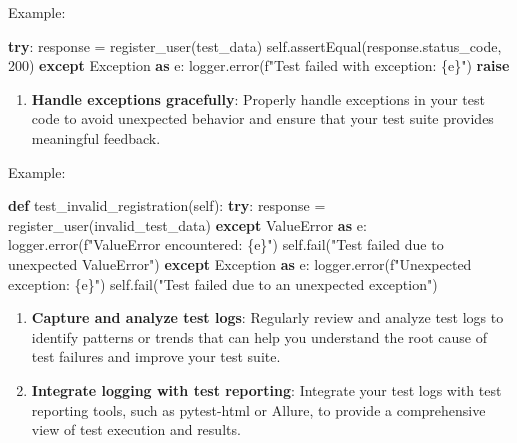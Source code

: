 \documentclass[
  paper=a4,
  ,captions=tableheading
]{scrartcl}
\newenvironment{Shaded}{}{}
\newcommand{\ControlFlowTok}[1]{\textcolor[rgb]{0.00,0.44,0.13}{\textbf{#1}}}
\newcommand{\DecValTok}[1]{\textcolor[rgb]{0.25,0.63,0.44}{#1}}
\newcommand{\ImportTok}[1]{\textcolor[rgb]{0.00,0.50,0.00}{\textbf{#1}}}
\newcommand{\KeywordTok}[1]{\textcolor[rgb]{0.00,0.44,0.13}{\textbf{#1}}}
\newcommand{\NormalTok}[1]{#1}
\newcommand{\OperatorTok}[1]{\textcolor[rgb]{0.40,0.40,0.40}{#1}}
\newcommand{\PreprocessorTok}[1]{\textcolor[rgb]{0.74,0.48,0.00}{#1}}
\newcommand{\SpecialCharTok}[1]{\textcolor[rgb]{0.25,0.44,0.63}{#1}}
\newcommand{\SpecialStringTok}[1]{\textcolor[rgb]{0.73,0.40,0.53}{#1}}
\newcommand{\StringTok}[1]{\textcolor[rgb]{0.25,0.44,0.63}{#1}}
\newcommand{\VariableTok}[1]{\textcolor[rgb]{0.10,0.09,0.49}{#1}}
\providecommand{\tightlist}{%
  \setlength{\itemsep}{0pt}\setlength{\parskip}{0pt}}
\begin{document}
Example:

\begin{Shaded}
\begin{Highlighting}[]
\ControlFlowTok{try}\NormalTok{:}
\NormalTok{    response }\OperatorTok{=}\NormalTok{ register\_user(test\_data)}
    \VariableTok{self}\NormalTok{.assertEqual(response.status\_code, }\DecValTok{200}\NormalTok{)}
\ControlFlowTok{except} \PreprocessorTok{Exception} \ImportTok{as}\NormalTok{ e:}
\NormalTok{    logger.error(}\SpecialStringTok{f"Test failed with exception: }\SpecialCharTok{\{}\NormalTok{e}\SpecialCharTok{\}}\SpecialStringTok{"}\NormalTok{)}
    \ControlFlowTok{raise}
\end{Highlighting}
\end{Shaded}

\begin{enumerate}
\def\labelenumi{\arabic{enumi}.}
\setcounter{enumi}{2}
\tightlist
\item
  \textbf{Handle exceptions gracefully}: Properly handle exceptions in
  your test code to avoid unexpected behavior and ensure that your test
  suite provides meaningful feedback.
\end{enumerate}

Example:

\begin{Shaded}
\begin{Highlighting}[]
\KeywordTok{def}\NormalTok{ test\_invalid\_registration(}\VariableTok{self}\NormalTok{):}
    \ControlFlowTok{try}\NormalTok{:}
\NormalTok{        response }\OperatorTok{=}\NormalTok{ register\_user(invalid\_test\_data)}
    \ControlFlowTok{except} \PreprocessorTok{ValueError} \ImportTok{as}\NormalTok{ e:}
\NormalTok{        logger.error(}\SpecialStringTok{f"ValueError encountered: }\SpecialCharTok{\{}\NormalTok{e}\SpecialCharTok{\}}\SpecialStringTok{"}\NormalTok{)}
        \VariableTok{self}\NormalTok{.fail(}\StringTok{"Test failed due to unexpected ValueError"}\NormalTok{)}
    \ControlFlowTok{except} \PreprocessorTok{Exception} \ImportTok{as}\NormalTok{ e:}
\NormalTok{        logger.error(}\SpecialStringTok{f"Unexpected exception: }\SpecialCharTok{\{}\NormalTok{e}\SpecialCharTok{\}}\SpecialStringTok{"}\NormalTok{)}
        \VariableTok{self}\NormalTok{.fail(}\StringTok{"Test failed due to an unexpected exception"}\NormalTok{)}
\end{Highlighting}
\end{Shaded}

\begin{enumerate}
\def\labelenumi{\arabic{enumi}.}
\setcounter{enumi}{3}
\item
  \textbf{Capture and analyze test logs}: Regularly review and analyze
  test logs to identify patterns or trends that can help you understand
  the root cause of test failures and improve your test suite.
\item
  \textbf{Integrate logging with test reporting}: Integrate your test
  logs with test reporting tools, such as pytest-html or Allure, to
  provide a comprehensive view of test execution and results.
\end{enumerate}
\end{document}
